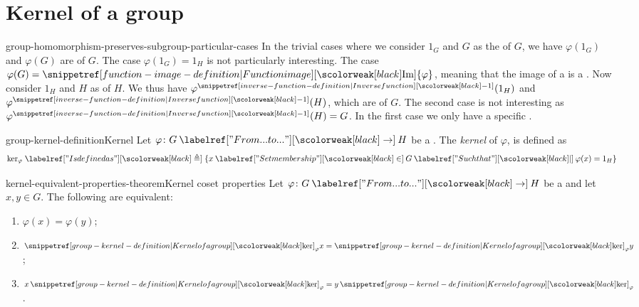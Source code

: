 \documentclass[preview]{standalone}
\begin{document}
\genpage

\section{Kernel of a group}

\begin{snippet}{group-homomorphism-preserves-subgroup-particular-cases}
    In the trivial cases where we consider \(1_G\) and \(G\) as the \subgroup[subgroups]
    of \(G\), we have \(\varphi(1_G)\) and \(\varphi(G)\) are \subgroup[subgroups]
    of \(G\). The case \(\varphi(1_G) = 1_H\) is not particularly interesting.
    The case \(\varphi(G) = \image\{\varphi\}\), meaning that the image of a \grouphomomorphism
    is a \subgroup. Now consider \(1_H\) and \(H\) as \subgroup[subgroups]
    of \(H\). We thus have \(\varphi^\inversefunction(1_H)\) and \(\varphi^\inversefunction(H)\),
    which are \subgroup[subgroups] of \(G\). The second case is not interesting as
    \(\varphi^\inversefunction(H) = G\). In the first case we only have a specific \subgroup.
\end{snippet}

\begin{snippetdefinition}{group-kernel-definition}{Kernel}
    Let \(\varphi \colon G \fromto H\) be a \grouphomomorphism.
    The \emph{kernel} of \(\varphi\), is defined as
    \[
        \text{ker}_\varphi \triangleq \{x\in G \suchthat \varphi(x) = 1_H\}
    \]
\end{snippetdefinition}

\begin{snippettheorem}{kernel-equivalent-properties-theorem}{Kernel coset properties}
    Let \(\varphi \colon G \fromto H\) be a \grouphomomorphism
    and let \(x,y \in G\). The following are equivalent:
    \begin{enumerate}[label=(\arabic*)]
        \item \(\varphi(x) = \varphi(y)\);
        \item \(\grpker_\varphi x = \grpker_\varphi y\);
        \item \(x\,\grpker_\varphi = y\,\grpker_\varphi\).
    \end{enumerate}
\end{snippettheorem}

\end{document}
